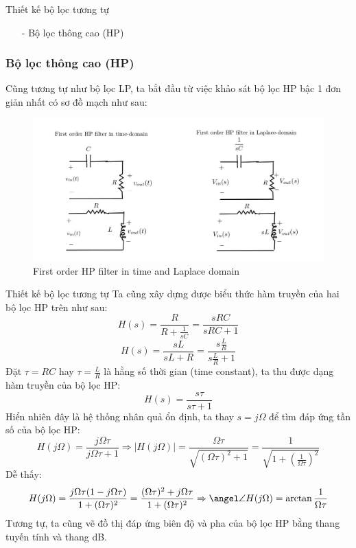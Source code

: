 \documentclass[8pt]{beamer}
\begin{document}
\begin{frame}{Thiết kế bộ lọc tương tự}
\begin{itemize}
	\item[-] Bộ lọc thông cao (HP)
\end{itemize}
\subsubsection{Bộ lọc thông cao (HP)}
Cũng tương tự như bộ lọc LP, ta bắt đầu từ việc khảo sát bộ lọc HP bậc 1 đơn giản nhất có sơ đồ mạch như sau:
\begin{figure}[h]
			\includegraphics[width=1.1\textwidth]{6.jpg}
			\caption{First order HP filter in time and Laplace domain}			\label{fig:re2}
		\end{figure}

\end{frame}
\begin{frame}{Thiết kế bộ lọc tương tự}
Ta cũng xây dựng được biểu thức hàm truyền của hai bộ lọc HP trên như sau:
$$H(s)=\frac{R}{R+\frac{1}{sC}}=\frac{sRC}{sRC+1}$$
$$H(s)=\frac{sL}{sL+R}=\frac{s\frac{L}{R}}{s\frac{L}{R}+1}$$
Đặt $\tau=RC$ hay $\tau=\frac{L}{R}$ là hằng số thời gian (time constant), ta thu được dạng hàm truyền của bộ lọc HP: $$H(s)=\frac{s\tau}{s\tau+1}$$
Hiển nhiên đây là hệ thống nhân quả ổn định, ta thay $s=j\Omega$ để tìm đáp ứng tần số của bộ lọc HP: $$H(j\Omega)=\frac{j\Omega\tau}{j\Omega\tau+1}\Rightarrow |H(j\Omega)|=\frac{\Omega\tau}{\sqrt{(\Omega\tau)^2+1}}=\frac{1}{\sqrt{1+\left(\frac{1}{\Omega\tau}\right)^2}}$$
Dễ thấy: $$H(j\Omega)=\frac{j\Omega\tau(1-j\Omega\tau)}{1+(\Omega\tau)^2}=\frac{(\Omega\tau)^2+j\Omega\tau}{1+(\Omega\tau)^2}\Rightarrow\angel \angle H(j\Omega)=\arctan{\frac{1}{\Omega\tau}}$$
Tương tự, ta cũng vẽ đồ thị đáp ứng biên độ và pha của bộ lọc HP bằng thang tuyến tính và thang dB.
\end{frame}
\end{document}
